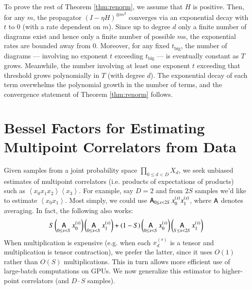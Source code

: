 \documentclass{article}
\theoremstyle{plain}
\theoremstyle{definition}
\newcommand{\wrap}[1]{\left(#1\right)}
\newcommand{\wang}[1]{\left\langle#1\right\rangle}
\DeclareMathOperator*{\Avg}{\text{\sffamily A}}
\begin{document}
            To prove the rest of Theorem \ref{thm:renorm}, we assume that $H$
            is positive.  Then, for any $m$, the propagator ${(I-\eta
            H)^{\otimes m}}^t$ converges via an exponential decay with $t$ to
            $0$ (with a rate dependent on $m$).
            Since up to degree $d$ only a finite number of diagrams exist and
            hence only a finite number of possible $m$s, the exponential rates
            are bounded away from $0$.  Moreover, for any fixed
            $t_{\text{big}}$, the number of diagrams --- involving no exponent
            $t$ exceeding  $t_{\text{big}}$ --- is eventually constant as $T$
            grows.  Meanwhile, the number involving at least one exponent $t$
            exceeding that threshold grows polynomially in $T$ (with degree
            $d$).  The exponential decay of each term overwhelms the polynomial
            growth in the number of terms, and the convergence statement of
            Theorem \ref{thm:renorm} follows.


\section{Bessel Factors for Estimating Multipoint Correlators from Data}\label{sect:bessel}

    Given samples from a joint probability space $\prod_{0\leq d<D} X_d$, we
    seek unbiased estimates of multipoint correlators (i.e. products of
    expectations of products) such as $\wang{x_0 x_1 x_2}\wang{x_3}$.  For
    example, say $D=2$ and from $2S$ samples we'd like to estimate $\wang{x_0
    x_1}$.  Most simply, we could use $\Avg_{0\leq s<2S} x_0^{(s)} x_1^{(s)}$,
    where $\Avg$ denotes averaging.  In fact, the following also works:
    \begin{equation} \label{eq:bessel}
        S
        \wrap{\Avg_{0\leq s< S} x_0^{(s)}}
        \wrap{\Avg_{0\leq s< S} x_1^{(s)}}
        +
        (1-S)
        \wrap{\Avg_{0\leq s< S} x_0^{(s)}}
        \wrap{\Avg_{S\leq s<2S} x_1^{(s)}}
    \end{equation}
    When multiplication is expensive (e.g. when each $x_d^{(s)}$ is a tensor
    and multiplication is tensor contraction), we prefer the latter, since it
    uses $O(1)$ rather than $O(S)$ multiplications.  This in turn allows more
    efficient use of large-batch computations on GPUs.  We now generalize this
    estimator to higher-point correlators (and $D\cdot S$ samples).
\end{document}
